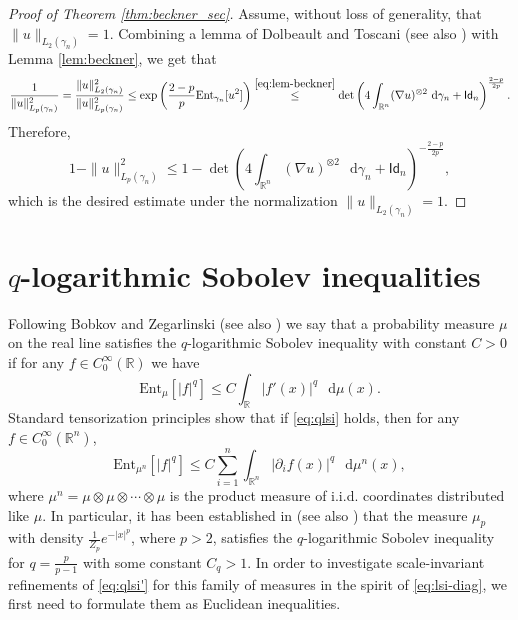 \documentclass[a4paper,twoside,11pt,reqno]{amsart}
\newcommand*\diff{\mathop{}\!\mathrm{d}}
\newcommand{\R}{\mathbb{R}} %
\newcommand{\msf}{\mathsf}
\newcommand{\mr}{\mathrm}
\begin{document}
\begin{proof} [Proof of Theorem \ref{thm:beckner_sec}]
Assume, without loss of generality, that $\|u\|_{L_2(\gamma_n)}=1$. Combining a lemma of Dolbeault and Toscani \cite[Lemma~5]{DT16} (see also \cite{LO00}) with Lemma \ref{lem:beckner}, we get that
\begin{equation}
\frac{1}{\|u\|_{L_p(\gamma_n)}^2} = \frac{\|u\|_{L_2(\gamma_n)}^2}{\|u\|_{L_p(\gamma_n)}^2} \leq \exp \left(\frac{2-p}{p} \mr{Ent}_{\gamma_n}[u^2]\right) \stackrel{\eqref{eq:lem-beckner}}{\leq} \det \left( 4 \int_{\R^n} (\nabla u)^{\otimes 2} \,\diff \gamma_n + \msf{Id}_n \right)^{\frac{2-p}{2p}}.
\end{equation}
Therefore,
\begin{equation}
1-\|u\|_{L_p(\gamma_n)}^2 \leq 1-\det \left( 4 \int_{\R^n} (\nabla u)^{\otimes 2} \,\diff \gamma_n + \msf{Id}_n \right)^{-\frac{2-p}{2p}},
\end{equation}
which is the desired estimate under the normalization $\|u\|_{L_2(\gamma_n)}=1$.
\end{proof}


\section{$q$-logarithmic Sobolev inequalities} \label{sec:qlsi}

Following Bobkov and Zegarlinski \cite{BZ05} (see also \cite{BR08}) we say that a probability measure $\mu$ on the real line satisfies the $q$-logarithmic Sobolev inequality with constant $C>0$ if for any $f\in C_0^\infty(\R)$ we have
\begin{equation} \label{eq:qlsi}
\mathrm{Ent}_\mu [ |f|^q ] \leq C \int_\R  |f'(x)|^q\,\diff\mu(x).
\end{equation}
Standard tensorization principles show that if \eqref{eq:qlsi} holds, then for any $f\in C_0^\infty(\R^n)$,
\begin{equation} \label{eq:qlsi'}
\mathrm{Ent}_{\mu^{n}} [|f|^q] \leq C \sum_{i=1}^n\int_{\R^n} |\partial_i f(x)|^q\, \diff\mu^n(x),
\end{equation}
where $\mu^n = \mu\otimes\mu\otimes\cdots\otimes\mu$ is the product measure of i.i.d. coordinates distributed like $\mu$.  In particular, it has been established in \cite[Corollary~5.6]{BZ05} (see also \cite[Section~5]{BL00}) that the measure $\mu_p$ with density $\tfrac{1}{Z_p}e^{-|x|^p}$, where $p>2$, satisfies the $q$-logarithmic Sobolev inequality for $q=\tfrac{p}{p-1}$ with some constant $C_q>1$.  In order to investigate scale-invariant refinements of \eqref{eq:qlsi'} for this family of measures in the spirit of \eqref{eq:lsi-diag}, we first need to formulate them as Euclidean inequalities.
\end{document}
